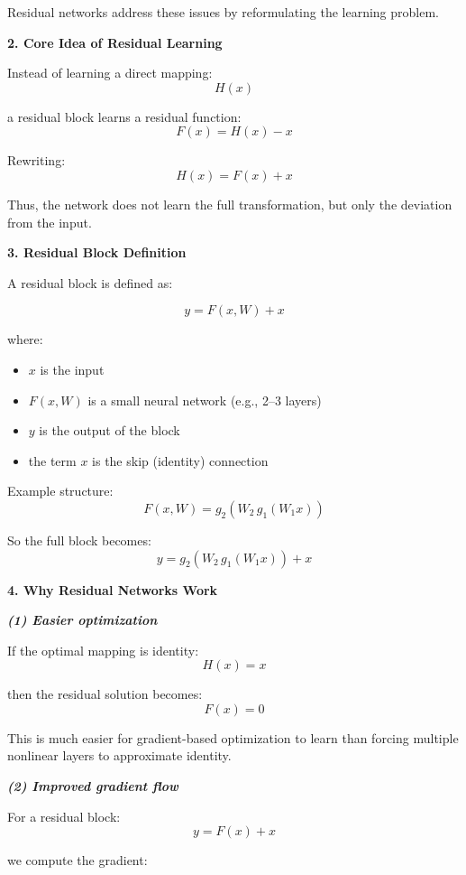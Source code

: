 \documentclass[12pt]{report}
\begin{document}
Residual networks address these issues by reformulating the learning problem.


\textbf{2. Core Idea of Residual Learning}

Instead of learning a direct mapping:
\[
H(x)
\]

a residual block learns a residual function:
\[
F(x) = H(x) - x
\]

Rewriting:
\[
H(x) = F(x) + x
\]

Thus, the network does not learn the full transformation, but only the deviation from the input.


\textbf{3. Residual Block Definition}

A residual block is defined as:

\[
y = F(x, W) + x
\]

where:
\begin{itemize}
	\item $x$ is the input
	\item $F(x, W)$ is a small neural network (e.g., 2--3 layers)
	\item $y$ is the output of the block
	\item the term $x$ is the skip (identity) connection
\end{itemize}

Example structure:
\[
F(x, W) = g_2(W_2 \, g_1(W_1 x))
\]

So the full block becomes:
\[
y = g_2(W_2 \, g_1(W_1 x)) + x
\]


\textbf{4. Why Residual Networks Work}

\textbf{\textit{(1) Easier optimization}}

If the optimal mapping is identity:
\[
H(x) = x
\]

then the residual solution becomes:
\[
F(x) = 0
\]

This is much easier for gradient-based optimization to learn than forcing multiple nonlinear layers to approximate identity.


\textbf{\textit{(2) Improved gradient flow}}

For a residual block:
\[
y = F(x) + x
\]

we compute the gradient:
\end{document}
